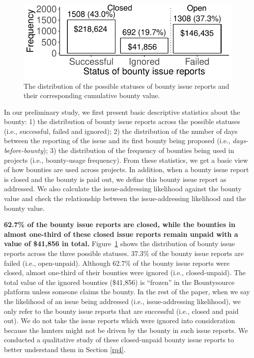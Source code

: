 \begin{figure}[t]
\centering\includegraphics[width=0.8\columnwidth ]{pics/pre/pre_statusOfBounties.pdf}
\vspace{-0.1in}
\caption{The distribution of the possible statuses of bounty issue reports and their corresponding cumulative bounty value.}
\label{fig:pre_status_Bounties}
\vspace{-0.2in}

\end{figure}





In our preliminary study, we first present basic descriptive statistics
about the bounty: 1) the distribution of bounty issue reports across the possible statuses (i.e., successful, failed and ignored); 2) the distribution of the number of days between the reporting of the issue and its first bounty being proposed (i.e., \textit{days-before-bounty}); 3) the distribution of the frequency of bounties being used in projects (i.e., bounty-usage frequency).
From these statistics, we get a basic view of how bounties are used across projects. In addition, when a bounty issue report is closed and the bounty is paid out, we define this bounty issue report as addressed. We also calculate the issue-addressing likelihood against the bounty value and check the relationship between the issue-addressing likelihood and the bounty value.





\textbf{62.7\% of the bounty issue reports are closed, while the bounties in almost one-third of these closed issue reports remain unpaid with a value of \$41,856 in total.}
Figure~\ref{fig:pre_status_Bounties} shows the distribution of bounty issue reports across the three possible statuses. 37.3\% of the bounty issue reports are failed (i.e., open-unpaid). Although 62.7\% of the bounty issue reports were closed, almost one-third of their bounties were ignored (i.e., closed-unpaid). The total value of the ignored bounties (\$41,856) is ``frozen'' in the Bountysource platform unless someone claims the bounty.
In the rest of the paper, when we say the likelihood of an issue being addressed (i.e., issue-addressing likelihood), we only refer to the bounty issue reports that are successful (i.e., closed and paid out). We do not take the issue reports which were ignored into consideration because the hunters might not be driven by the bounty in such issue reports. We conducted a qualitative study of these closed-unpaid bounty issue reports to better understand them in Section \ref{rq4}.


